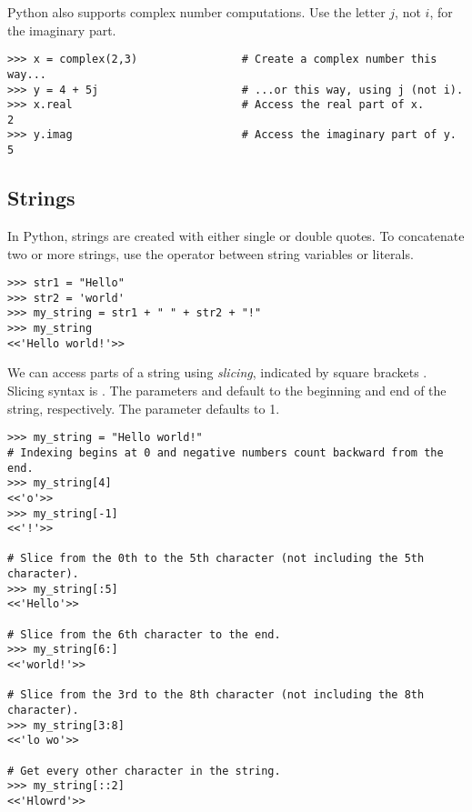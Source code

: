 Python also supports complex number computations.
Use the letter $j$, not $i$, for the imaginary part.
\begin{lstlisting}
>>> x = complex(2,3)                # Create a complex number this way...
>>> y = 4 + 5j	                    # ...or this way, using j (not i).
>>> x.real                          # Access the real part of x.
2
>>> y.imag                          # Access the imaginary part of y.
5
\end{lstlisting}


\subsection*{Strings}
In Python, strings are created with either single or double quotes.
To concatenate two or more strings, use the \li{+} operator between string variables or literals.
\begin{lstlisting}
>>> str1 = "Hello"
>>> str2 = 'world'
>>> my_string = str1 + " " + str2 + "!"
>>> my_string
<<'Hello world!'>>
\end{lstlisting}

We can access parts of a string using \emph{slicing}, indicated by square brackets \li{[ ]}.
Slicing syntax is .
The parameters  and  default to the beginning and end of the string, respectively.
The parameter  defaults to 1.

\begin{lstlisting}
>>> my_string = "Hello world!"
# Indexing begins at 0 and negative numbers count backward from the end.
>>> my_string[4]
<<'o'>>
>>> my_string[-1]
<<'!'>>

# Slice from the 0th to the 5th character (not including the 5th character).
>>> my_string[:5]
<<'Hello'>>

# Slice from the 6th character to the end.
>>> my_string[6:]
<<'world!'>>

# Slice from the 3rd to the 8th character (not including the 8th character).
>>> my_string[3:8]
<<'lo wo'>>

# Get every other character in the string.
>>> my_string[::2]
<<'Hlowrd'>>
\end{lstlisting}

